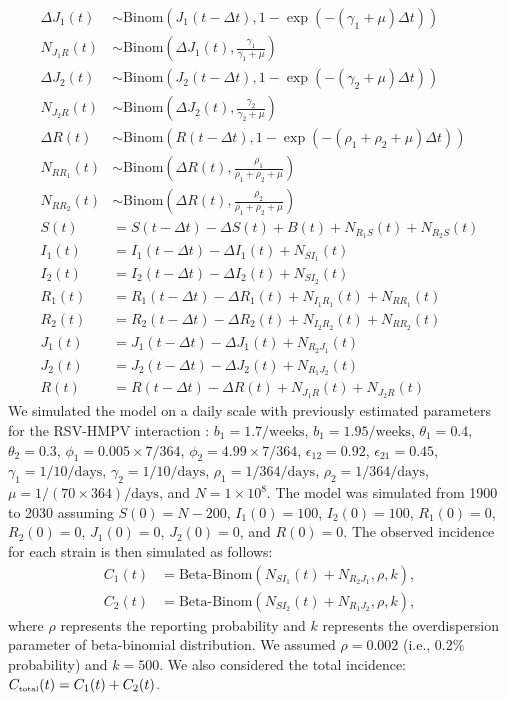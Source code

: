 \documentclass[12pt]{article}
\newcommand{\tsub}[2]{#1_{{\textrm{\tiny #2}}}}
\begin{document}
\begin{align}
\Delta J_1(t) &\sim \mathrm{Binom}\left(J_1(t-\Delta t), 1- \exp(-(\gamma_1 + \mu) \Delta t )\right) \\
N_{J_1R}(t) &\sim \mathrm{Binom}\left(\Delta J_1(t), \frac{\gamma_1}{\gamma_1 + \mu} \right)\\
\Delta J_2(t) &\sim \mathrm{Binom}\left(J_2(t-\Delta t), 1- \exp(-(\gamma_2 + \mu) \Delta t )\right) \\
N_{J_2R}(t) &\sim \mathrm{Binom}\left(\Delta J_2(t), \frac{\gamma_2}{\gamma_2 + \mu} \right)\\
\Delta R(t) &\sim \mathrm{Binom}\left(R(t-\Delta t), 1- \exp(-(\rho_1 + \rho_2 + \mu) \Delta t )\right) \\
N_{RR_1}(t) &\sim \mathrm{Binom}\left(\Delta R(t), \frac{\rho_1}{\rho_1 + \rho_2 + \mu} \right)\\
N_{RR_2}(t) &\sim \mathrm{Binom}\left(\Delta R(t), \frac{\rho_2}{\rho_1 + \rho_2 + \mu} \right)\\
S(t) &= S(t-\Delta t) - \Delta S(t) + B(t) + N_{R_1S}(t) + N_{R_2S}(t)\\
I_1(t) &= I_1(t-\Delta t) - \Delta I_1(t) + N_{SI_1}(t) \\
I_2(t) &= I_2(t-\Delta t) - \Delta I_2(t) + N_{SI_2}(t) \\
R_1(t) &= R_1(t-\Delta t) - \Delta R_1(t) + N_{I_1R_1}(t) + N_{RR_1}(t)\\
R_2(t) &= R_2(t-\Delta t) - \Delta R_2(t) + N_{I_2R_2}(t) + N_{RR_2}(t)\\
J_1(t) &= J_1(t-\Delta t) - \Delta J_1(t) + N_{R_2J_1}(t) \\
J_2(t) &= J_2(t-\Delta t) - \Delta J_2(t) + N_{R_1J_2}(t) \\
R(t) &= R(t-\Delta t) - \Delta R(t) + N_{J_1 R}(t) + N_{J_2 R}(t) 
\end{align}
We simulated the model on a daily scale with previously estimated parameters for the RSV-HMPV interaction \citep{bhattacharyya2015cross}:
$b_1=1.7/\mathrm{weeks}$, $b_1=1.95/\mathrm{weeks}$, $\theta_1 = 0.4$, $\theta_2 = 0.3$, $\phi_1=0.005 \times 7/364$, $\phi_2=4.99 \times 7/364$, $\epsilon_{12}=0.92$, $\epsilon_{21}=0.45$, $\gamma_1=1/10/\mathrm{days}$, $\gamma_2=1/10/\mathrm{days}$, $\rho_1=1/364/\mathrm{days}$, $\rho_2=1/364/\mathrm{days}$, $\mu=1/(70\times 364)/\mathrm{days}$, and $N = 1 \times 10^8$.
The model was simulated from 1900 to 2030 assuming $S(0) = N - 200$, $I_1(0) = 100$, $I_2(0) = 100$, $R_1(0) = 0$, $R_2(0) = 0$, $J_1(0) = 0$, $J_2(0) = 0$, and $R(0) = 0$.
The observed incidence for each strain is then simulated as follows:
\begin{align}
C_1(t) &= \textrm{Beta-Binom}(N_{SI_1}(t) + N_{R_2J_1}, \rho, k),\\ 
C_2(t) &= \textrm{Beta-Binom}(N_{SI_2}(t) + N_{R_1J_2}, \rho, k),
\end{align}
where $\rho$ represents the reporting probability and $k$ represents the overdispersion parameter of beta-binomial distribution.
We assumed $\rho = 0.002$ (i.e., 0.2\% probability) and $k = 500$.
We also considered the total incidence: $\tsub{C}{total}(t) = C_1(t) + C_2(t)$.
\end{document}
